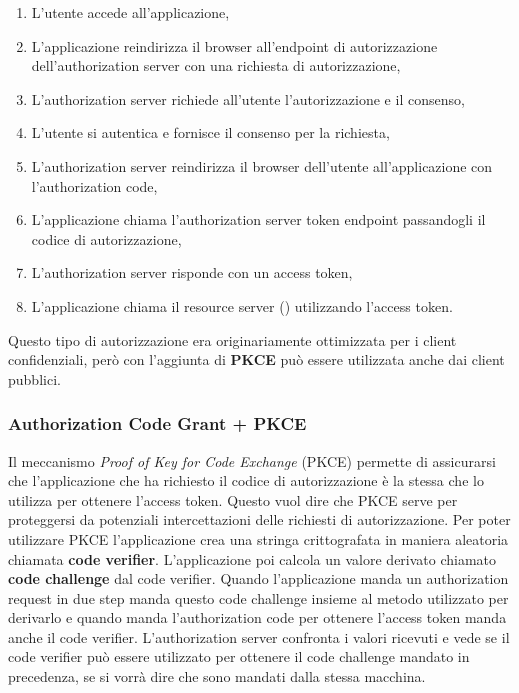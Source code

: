 \begin{enumerate}
      \item L'utente accede all'applicazione,
      \item L'applicazione reindirizza il browser all'endpoint di autorizzazione
            dell'authorization server con una richiesta di autorizzazione,
      \item L'authorization server richiede all'utente l'autorizzazione e il consenso,
      \item L'utente si autentica e fornisce il consenso per la richiesta,
      \item L'authorization server reindirizza il browser dell'utente all'applicazione
            con l'authorization code,
      \item L'applicazione chiama l'authorization server token endpoint passandogli
            il codice di autorizzazione,
      \item L'authorization server risponde con un access token,
      \item L'applicazione chiama il resource server (\api{}) utilizzando l'access token.
\end{enumerate}

Questo tipo di autorizzazione era originariamente ottimizzata per i
client confidenziali, però con l'aggiunta di \textbf{PKCE} può essere utilizzata anche dai
client pubblici.

\subsubsection{Authorization Code Grant + PKCE}

Il meccanismo \textit{Proof of Key for Code Exchange} (PKCE) permette di assicurarsi
che l'applicazione che ha richiesto il codice di autorizzazione è la stessa che lo
utilizza per ottenere l'access token. Questo vuol dire che PKCE serve per proteggersi
da potenziali intercettazioni delle richiesti di autorizzazione.
Per poter utilizzare PKCE l'applicazione crea una stringa crittografata in maniera
aleatoria chiamata \textbf{code verifier}. L'applicazione poi calcola un valore derivato
chiamato \textbf{code challenge} dal code verifier. Quando l'applicazione manda un
authorization request in due step manda questo code challenge insieme al metodo utilizzato
per derivarlo e quando manda l'authorization code per ottenere l'access token manda anche
il code verifier. L'authorization server confronta i valori ricevuti e vede se
il code verifier può essere utilizzato per ottenere il code challenge mandato in precedenza,
se si vorrà dire che sono mandati dalla stessa macchina.\\

